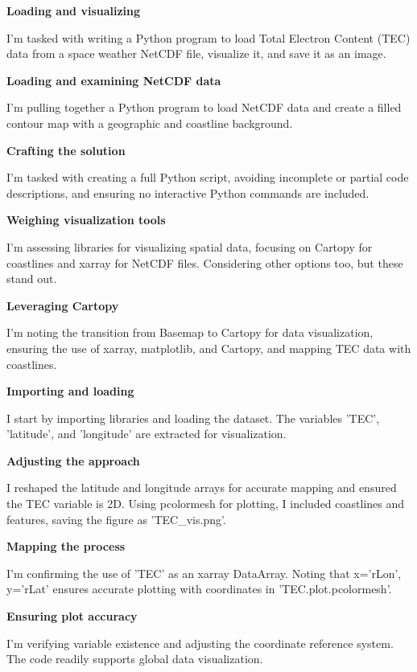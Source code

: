 \begin{tcolorbox}[title=Task: Load Total Electron Content (TEC) data from a space weather NetCDF file and visualize it as a filled contour map with a geographical and coastline background.]
\small

\textbf{Loading and visualizing}

I'm tasked with writing a Python program to load Total Electron Content (TEC) data from a space weather NetCDF file, visualize it, and save it as an image.

\textbf{Loading and examining NetCDF data}

I’m pulling together a Python program to load NetCDF data and create a filled contour map with a geographic and coastline background.

\textbf{Crafting the solution}

I’m tasked with creating a full Python script, avoiding incomplete or partial code descriptions, and ensuring no interactive Python commands are included.

\textbf{Weighing visualization tools}

I'm assessing libraries for visualizing spatial data, focusing on Cartopy for coastlines and xarray for NetCDF files. Considering other options too, but these stand out.

\textbf{Leveraging Cartopy}

I'm noting the transition from Basemap to Cartopy for data visualization, ensuring the use of xarray, matplotlib, and Cartopy, and mapping TEC data with coastlines.

\textbf{Importing and loading}

I start by importing libraries and loading the dataset. The variables 'TEC', 'latitude', and 'longitude' are extracted for visualization.

\textbf{Adjusting the approach}

I reshaped the latitude and longitude arrays for accurate mapping and ensured the TEC variable is 2D. Using pcolormesh for plotting, I included coastlines and features, saving the figure as 'TEC\_vis.png'.

\textbf{Mapping the process}

I'm confirming the use of 'TEC' as an xarray DataArray. Noting that x='rLon', y='rLat' ensures accurate plotting with coordinates in 'TEC.plot.pcolormesh'.

\textbf{Ensuring plot accuracy}

I’m verifying variable existence and adjusting the coordinate reference system. The code readily supports global data visualization.

\end{tcolorbox}

